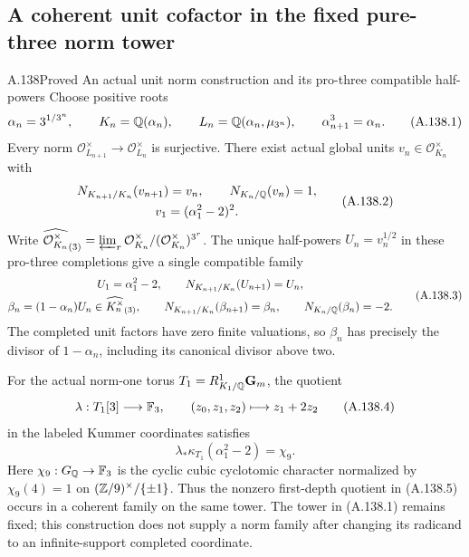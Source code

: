 \subsection{A coherent unit cofactor in the fixed pure-three norm tower}

\begin{statement}{A.138}{Proved}
{An actual unit norm construction and its pro-three compatible half-powers}
Choose positive roots
\[
 \alpha_n=3^{1/3^n},\qquad
 K_n=\mathbb Q(\alpha_n),\qquad
 L_n=\mathbb Q(\alpha_n,\mu_{3^n}),\qquad
 \alpha_{n+1}^3=\alpha_n .
\tag{A.138.1}
\]
Every norm
\(\mathcal O_{L_{n+1}}^\times\to
\mathcal O_{L_n}^\times\) is surjective.
There exist actual global units \(v_n\in\mathcal O_{K_n}^\times\)
with
\[
 \begin{gathered}
 N_{K_{n+1}/K_n}(v_{n+1})=v_n,\qquad
 N_{K_n/\mathbb Q}(v_n)=1,\\
 v_1=(\alpha_1^2-2)^2 .
 \end{gathered}
\tag{A.138.2}
\]
Write
\(\widehat{\mathcal O_{K_n}^\times}_{(3)}
=\varprojlim_r\mathcal O_{K_n}^\times/
(\mathcal O_{K_n}^\times)^{3^r}\).
The unique half-powers \(U_n=v_n^{1/2}\) in these
pro-three completions give a single compatible family
\[
 \begin{gathered}
 U_1=\alpha_1^2-2,\qquad
 N_{K_{n+1}/K_n}(U_{n+1})=U_n,\\
 \beta_n=(1-\alpha_n)U_n
       \in\widehat{K_n^\times}_{(3)},\qquad
 N_{K_{n+1}/K_n}(\beta_{n+1})=\beta_n,\qquad
 N_{K_n/\mathbb Q}(\beta_n)=-2 .
 \end{gathered}
\tag{A.138.3}
\]
The completed unit factors have zero finite valuations,
so \(\beta_n\) has precisely the divisor of \(1-\alpha_n\),
including its canonical divisor above two.

For the actual norm-one torus
\(T_1=R^1_{K_1/\mathbb Q}\mathbf G_m\), the quotient
\[
 \lambda:T_1[3]\longrightarrow\mathbb F_3,\qquad
        (z_0,z_1,z_2)\longmapsto z_1+2z_2
\tag{A.138.4}
\]
in the labeled Kummer coordinates satisfies
\[
 \lambda_*\kappa_{T_1}(\alpha_1^2-2)=\chi_9 .
\tag{A.138.5}
\]
Here \(\chi_9:G_\mathbb Q\to\mathbb F_3\) is the cyclic cubic
cyclotomic character normalized by \(\chi_9(4)=1\)
on \((\mathbb Z/9)^\times/\{\pm1\}\).
Thus the nonzero first-depth quotient in (A.138.5)
occurs in a coherent family on the same tower.
The tower in (A.138.1) remains fixed; this construction
does not supply a norm family after changing its
radicand to an infinite-support completed coordinate.
\end{statement}
